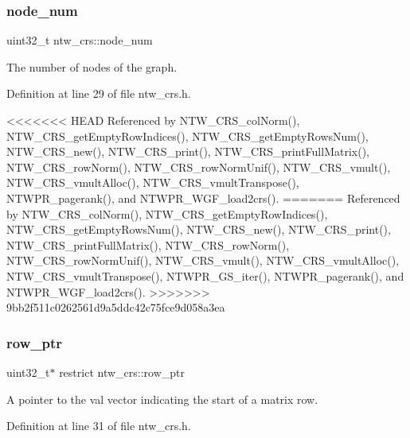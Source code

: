 \subsubsection{\texorpdfstring{node\+\_\+num}{node\_num}}
{\footnotesize\ttfamily uint32\+\_\+t ntw\+\_\+crs\+::node\+\_\+num}

The number of nodes of the graph. 

Definition at line 29 of file ntw\+\_\+crs.\+h.



<<<<<<< HEAD
Referenced by N\+T\+W\+\_\+\+C\+R\+S\+\_\+col\+Norm(), N\+T\+W\+\_\+\+C\+R\+S\+\_\+get\+Empty\+Row\+Indices(), N\+T\+W\+\_\+\+C\+R\+S\+\_\+get\+Empty\+Rows\+Num(), N\+T\+W\+\_\+\+C\+R\+S\+\_\+new(), N\+T\+W\+\_\+\+C\+R\+S\+\_\+print(), N\+T\+W\+\_\+\+C\+R\+S\+\_\+print\+Full\+Matrix(), N\+T\+W\+\_\+\+C\+R\+S\+\_\+row\+Norm(), N\+T\+W\+\_\+\+C\+R\+S\+\_\+row\+Norm\+Unif(), N\+T\+W\+\_\+\+C\+R\+S\+\_\+vmult(), N\+T\+W\+\_\+\+C\+R\+S\+\_\+vmult\+Alloc(), N\+T\+W\+\_\+\+C\+R\+S\+\_\+vmult\+Transpose(), N\+T\+W\+P\+R\+\_\+pagerank(), and N\+T\+W\+P\+R\+\_\+\+W\+G\+F\+\_\+load2crs().
=======
Referenced by N\+T\+W\+\_\+\+C\+R\+S\+\_\+col\+Norm(), N\+T\+W\+\_\+\+C\+R\+S\+\_\+get\+Empty\+Row\+Indices(), N\+T\+W\+\_\+\+C\+R\+S\+\_\+get\+Empty\+Rows\+Num(), N\+T\+W\+\_\+\+C\+R\+S\+\_\+new(), N\+T\+W\+\_\+\+C\+R\+S\+\_\+print(), N\+T\+W\+\_\+\+C\+R\+S\+\_\+print\+Full\+Matrix(), N\+T\+W\+\_\+\+C\+R\+S\+\_\+row\+Norm(), N\+T\+W\+\_\+\+C\+R\+S\+\_\+row\+Norm\+Unif(), N\+T\+W\+\_\+\+C\+R\+S\+\_\+vmult(), N\+T\+W\+\_\+\+C\+R\+S\+\_\+vmult\+Alloc(), N\+T\+W\+\_\+\+C\+R\+S\+\_\+vmult\+Transpose(), N\+T\+W\+P\+R\+\_\+\+G\+S\+\_\+iter(), N\+T\+W\+P\+R\+\_\+pagerank(), and N\+T\+W\+P\+R\+\_\+\+W\+G\+F\+\_\+load2crs().
>>>>>>> 9bb2f511c0262561d9a5ddc42c75fce9d058a3ea

\mbox{\label{structntw__crs_abf117885ca226f2a82ff28dca7177c34}} 
\subsubsection{\texorpdfstring{row\+\_\+ptr}{row\_ptr}}
{\footnotesize\ttfamily uint32\+\_\+t$\ast$ restrict ntw\+\_\+crs\+::row\+\_\+ptr}

A pointer to the val vector indicating the start of a matrix\textquotesingle{} row. 

Definition at line 31 of file ntw\+\_\+crs.\+h.




